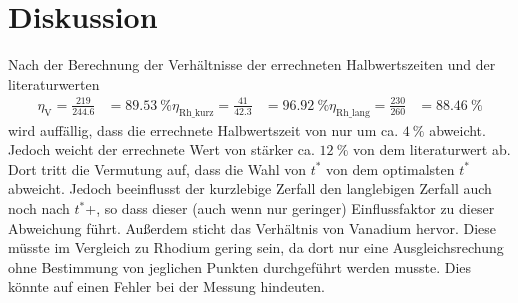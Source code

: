 \section{Diskussion}
\label{sec:Diskussion}
Nach der Berechnung der Verhältnisse der errechneten Halbwertszeiten und der literaturwerten
\begin{align*}
  \eta_\text{V} =   \frac{219}{244.6} & = \SI{89.53}{\percent}
  \eta_\text{Rh_kurz} =   \frac{41}{42.3} & = \SI{96.92}{\percent}
  \eta_\text{Rh_lang} =   \frac{230}{260} & = \SI{88.46}{\percent}
\end{align*}
wird auffällig, dass die errechnete Halbwertszeit von  nur um ca. $\SI{4}{\percent}$ abweicht.
Jedoch weicht der errechnete Wert von  stärker {ca. $\SI{12}{\percent}$} von dem literaturwert ab.
Dort tritt die Vermutung auf, dass die Wahl von $t^*$ von dem optimalsten $t^*$ abweicht.
Jedoch beeinflusst der kurzlebige Zerfall den langlebigen Zerfall auch noch nach $t^*$+, so dass dieser (auch wenn nur geringer) Einflussfaktor
zu dieser Abweichung führt. Außerdem sticht das Verhältnis von Vanadium hervor.
Diese müsste im Vergleich zu Rhodium gering sein, da dort nur eine Ausgleichsrechung ohne Bestimmung von jeglichen Punkten 
durchgeführt werden musste. Dies könnte auf einen Fehler bei der Messung hindeuten.
